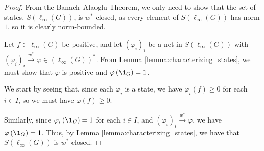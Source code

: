 \begin{proof}
  From the Banach--Alaoglu Theorem, we only need to show that the set of states, $S\left(\ell_{\infty}\left(G\right)\right)$, is $w^{\ast}$-closed, as every element of $S\left(\ell_{\infty}\left(G\right)\right)$ has norm $1$, so it is clearly norm-bounded.\newline

  Let $f\in \ell_{\infty}\left(G\right)$ be positive, and let $\left(\varphi_{i}\right)_i$ be a net in $S\left(\ell_{\infty}\left(G\right)\right)$ with $\left(\varphi_{i}\right)_i\xrightarrow{w^{\ast}} \varphi\in \left(\ell_{\infty}\left(G\right)\right)^{\ast}$. From Lemma \ref{lemma:characterizing_states}, we must show that $\varphi$ is positive and $\varphi\left(\1_{G}\right) = 1$.\newline

  We start by seeing that, since each $\varphi_i$ is a state, we have $\varphi_{i}\left(f\right) \geq 0$ for each $i\in I$, so we must have $\varphi\left(f\right) \geq 0$.\newline

  Similarly, since $\varphi_{i}\left(\1_{G}\right) = 1$ for each $i\in I$, and $\left(\varphi_i\right)_i \xrightarrow{w^{\ast}} \varphi$, we have $\varphi\left(\1_{G}\right) = 1$. Thus, by Lemma \ref{lemma:characterizing_states}, we have that $S\left(\ell_{\infty}\left(G\right)\right)$ is $w^{\ast}$-closed.
\end{proof}

